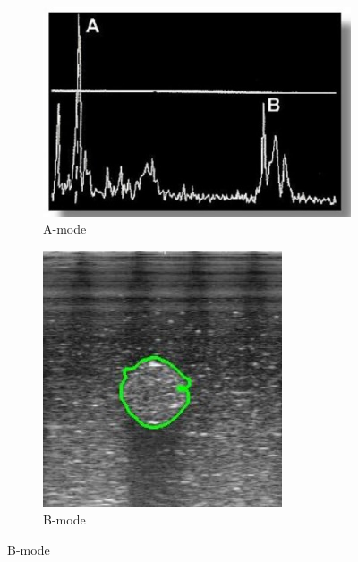 \documentclass[12pt]{article}
\begin{document}
\begin{figure}[h!]
  \centering
  \begin{subfigure}[b]{0.32\linewidth}
    \centering
    \includegraphics[width=1\linewidth]{A.jpg}
    \caption{A-mode}
  \end{subfigure}
  \begin{subfigure}[b]{0.32\linewidth}
    \centering
    \includegraphics[width=1\linewidth]{b.jpg}
    \caption{B-mode}

\end{subfigure}
\end{figure}
\end{document}
